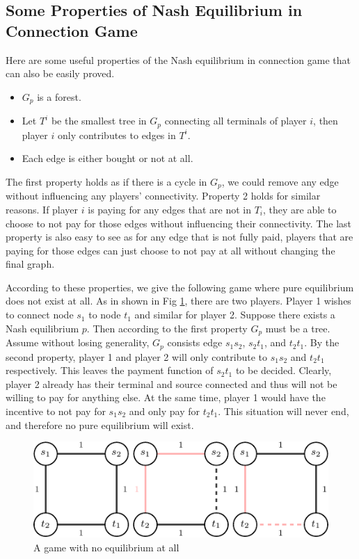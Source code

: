 \documentclass[11pt,psfig,times]{article}
\begin{document}
\subsection{Some Properties of Nash Equilibrium in Connection Game}
Here are some useful properties of the Nash equilibrium in connection game that can also be easily proved. 
\begin{itemize}
	\item \(G_p\) is a forest.
	\item Let \(T^i\) be the smallest tree in \(G_p\) connecting all terminals of player \(i\), then player \(i\) only contributes to edges in \(T^i\).
	\item Each edge is either bought or not at all. 
\end{itemize}
The first property holds as if there is a cycle in $G_p$, we could remove any edge without influencing any players' connectivity. Property 2 holds for similar reasons. If player $i$ is paying for any edges that are not in $T_i$, they are able to choose to not pay for those edges without influencing their connectivity. The last property is also easy to see as for any edge that is not fully paid, players that are paying for those edges can just choose to not pay at all without changing the final graph. 

According to these properties, we give the following game where pure equilibrium does not exist at all. As in shown in Fig \ref{fig:noequi}, there are two players. Player 1 wishes to connect node $s_1$ to node $t_1$ and similar for player 2. Suppose there exists a Nash equilibrium $p$. Then according to the first property $G_p$ must be a tree. Assume without losing generality, $G_p$ consists edge $s_1s_2$, $s_2t_1$, and $t_2t_1$. By the second property, player 1 and player 2 will only contribute to $s_1s_2$ and $t_2t_1$ respectively. This leaves the payment function of $s_2t_1$ to be decided. Clearly, player 2 already has their terminal and source connected and thus will not be willing to pay for anything else. At the same time, player 1 would have the incentive to not pay for $s_1s_2$ and only pay for $t_2t_1$. This situation will never end, and therefore no pure equilibrium will exist.

\begin{figure}
	\begin{center}
	\includegraphics{pictures/noequi.pdf}
	\end{center}
	\caption{A game with no equilibrium at all}
	\label{fig:noequi}
\end{figure}
\end{document}

